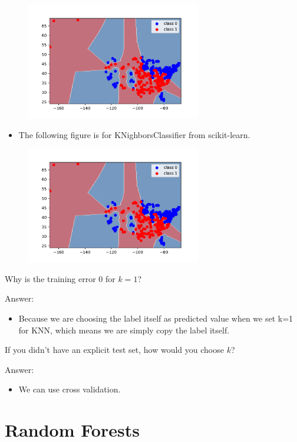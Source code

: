 \documentclass{article}
\def\gre#1{{\color{gre}#1}}
\begin{document}
{{\begin{figure}[H]
	\includegraphics[width=3in]{../figs/q3_3_myKNN(k=1)}
\end{figure}
\gre{
\begin{itemize}
	\item The following figure is for KNighborsClassifier from scikit-learn.
\end{itemize}}
\begin{figure}[H]
	\centering
	\includegraphics[width=3in]{../figs/q3_3_KNeighbors(k=1)}
\end{figure}
\item Why is the training error $0$ for $k=1$? \\
\gre{Answer:
\begin{itemize}
	\item Because we are choosing the label itself as predicted value when we set k=1 for KNN, which means we are simply copy the label itself.
\end{itemize}}
\item If you didn't have an explicit test set, how would you choose $k$? \\
\gre{Answer:
	\begin{itemize}
		\item We can use cross validation.
\end{itemize}}}}


\section{Random Forests}
\end{document}
